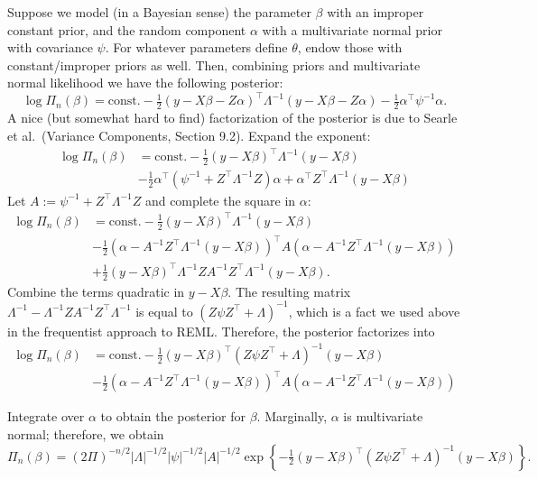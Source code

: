 \documentclass[
]{book}
\begin{document}
Suppose we model (in a Bayesian sense) the parameter \(\beta\) with an improper constant prior, and the random component \(\alpha\) with a multivariate normal prior with covariance \(\psi\). For whatever parameters define \(\theta\), endow those with constant/improper priors as well. Then, combining priors and multivariate normal likelihood we have the following posterior:
\[\log\Pi_n(\beta) = \text{const.} - \tfrac12 \left(y - X\beta - Z\alpha\right)^\top \Lambda^{-1}\left(y - X\beta - Z\alpha\right) - \tfrac12\alpha^\top \psi^{-1}\alpha . \]
A nice (but somewhat hard to find) factorization of the posterior is due to Searle et al.~(Variance Components, Section 9.2). Expand the exponent:
\begin{align*}
\log\Pi_n(\beta) &= \text{const.} - \tfrac12 \left(y - X\beta\right)^\top \Lambda^{-1}\left(y - X\beta\right)\\
&-\tfrac12 \alpha^\top (\psi^{-1} + Z^\top \Lambda^{-1}Z)\alpha + \alpha^\top Z^\top \Lambda^{-1}(y - X\beta)
\end{align*}
Let \(A:=\psi^{-1} + Z^\top \Lambda^{-1}Z\) and complete the square in \(\alpha\):
\begin{align*}
\log\Pi_n(\beta) &= \text{const.} - \tfrac12 \left(y - X\beta\right)^\top \Lambda^{-1}\left(y - X\beta\right)\\
&-\tfrac12(\alpha - A^{-1}Z^\top\Lambda^{-1}(y-X\beta))^\top A(\alpha - A^{-1}Z^\top\Lambda^{-1}(y-X\beta))\\
&+\tfrac12(y-X\beta)^\top\Lambda^{-1}ZA^{-1}Z^\top \Lambda^{-1} (y-X\beta). 
\end{align*}
Combine the terms quadratic in \(y-X\beta\). The resulting matrix \(\Lambda^{-1} - \Lambda^{-1}ZA^{-1}Z^\top \Lambda^{-1}\) is equal to \((Z\psi Z^\top + \Lambda)^{-1}\), which is a fact we used above in the frequentist approach to REML. Therefore, the posterior factorizes into
\begin{align*}
\log\Pi_n(\beta) &= \text{const.} - \tfrac12 \left(y - X\beta\right)^\top (Z\psi Z^\top +\Lambda)^{-1}(y - X\beta) \\
&- \tfrac12(\alpha - A^{-1}Z^\top\Lambda^{-1}(y-X\beta))^\top A(\alpha - A^{-1}Z^\top\Lambda^{-1}(y-X\beta)) \end{align*}

Integrate over \(\alpha\) to obtain the posterior for \(\beta\). Marginally, \(\alpha\) is multivariate normal; therefore, we obtain
\[\Pi_n(\beta) = (2\Pi)^{-n/2}|\Lambda|^{-1/2}|\psi|^{-1/2}|A|^{-1/2}\exp\left\{-\tfrac12 \left(y - X\beta\right)^\top (Z\psi Z^\top +\Lambda)^{-1}(y - X\beta)\right\}.\]
\end{document}
